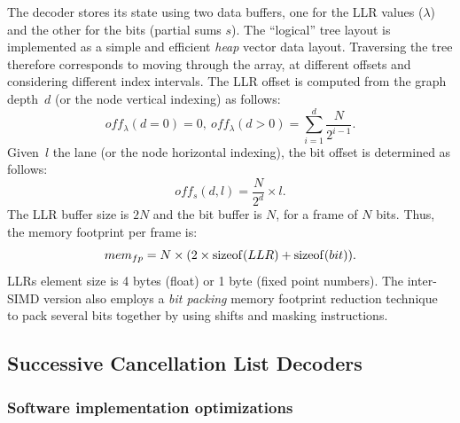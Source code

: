 The decoder stores its state using two data buffers, one for the LLR values
($\lambda$) and the other for the bits (partial sums $s$). The ``logical'' tree
layout is implemented as a simple and efficient \emph{heap} vector data layout.
Traversing the tree therefore corresponds to moving through the array, at
different offsets and considering different index intervals. The LLR offset is
computed from the graph depth~$d$ (or the node vertical indexing) as follows:
\begin{equation}
  off_{\lambda}(d = 0) = 0,~off_{\lambda}(d > 0) =
  \sum\limits_{i = 1}^{d} \frac{N}{2^{i-1}}.
\end{equation}
Given~$l$ the lane (or the node horizontal indexing), the bit offset is
determined as follows:
\begin{equation}
  off_{s}(d,l) = \frac{N}{2^d} \times l.
\end{equation}
The LLR buffer size is $2N$ and the bit buffer is $N$, for a frame of $N$ bits.
Thus, the memory footprint per frame is:
\begin{equation}
  mem_{fp} = N \times (2 \times \operatorname*{sizeof}(LLR) + \operatorname*{sizeof}(bit)).
\end{equation}
LLRs element size is 4 bytes (float) or 1 byte (fixed point numbers). The
inter-SIMD version also employs a \emph{bit packing} memory footprint reduction
technique~\cite{LeGal2015a} to pack several bits together by using shifts and
masking instructions.

\subsection{Successive Cancellation List Decoders}

\subsubsection{Software implementation optimizations}
\label{sec:polar_implem}

